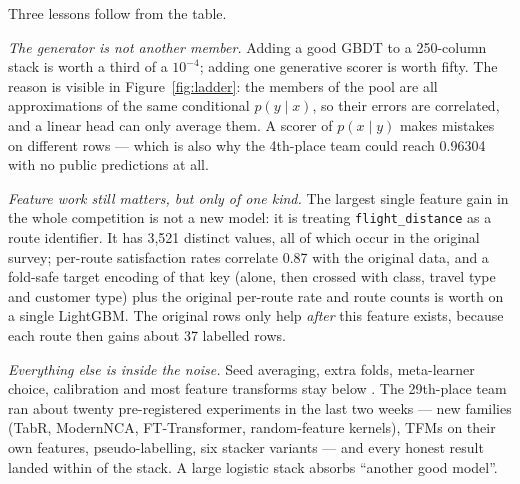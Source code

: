 Three lessons follow from the table.

\emph{The generator is not another member.} Adding a good GBDT to a 250-column stack is
worth a third of a $10^{-4}$; adding one generative scorer is worth fifty. The reason is
visible in Figure~\ref{fig:ladder}: the members of the pool are all approximations of the
same conditional $p(y\mid x)$, so their errors are correlated, and a linear head can only
average them. A scorer of $p(x\mid y)$ makes mistakes on different rows --- which is also
why the 4th-place team could reach 0.96304 with no public predictions at all.

\emph{Feature work still matters, but only of one kind.} The largest single feature gain in
the whole competition is not a new model: it is treating \texttt{flight\_distance} as a
route identifier. It has 3{,}521 distinct values, all of which occur in the original survey;
per-route satisfaction rates correlate 0.87 with the original data, and a fold-safe target
encoding of that key (alone, then crossed with class, travel type and customer type) plus
the original per-route rate and route counts is worth  on a single LightGBM. The
original rows only help \emph{after} this feature exists, because each route then gains
about 37 labelled rows.

\emph{Everything else is inside the noise.} Seed averaging, extra folds, meta-learner
choice, calibration and most feature transforms stay below . The 29th-place team ran
about twenty pre-registered experiments in the last two weeks --- new families (TabR,
ModernNCA, FT-Transformer, random-feature kernels), TFMs on their own features,
pseudo-labelling, six stacker variants --- and every honest result landed within
 of the stack. A large logistic stack absorbs ``another good model''.
